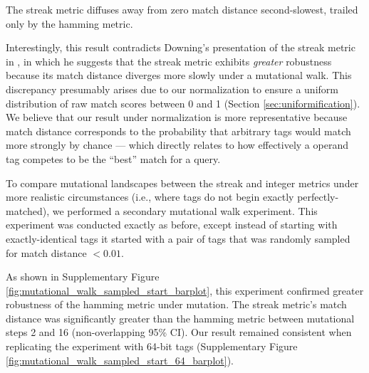 The streak metric diffuses away from zero match distance second-slowest, trailed only by the hamming metric.

Interestingly, this result contradicts Downing's presentation of the streak metric in \citep{downing2015intelligence}, in which he suggests that the streak metric exhibits \textit{greater} robustness because its match distance diverges more slowly under a mutational walk.
This discrepancy presumably arises due to our normalization to ensure a uniform distribution of raw match scores between 0 and 1 (Section \ref{sec:uniformification}).
We believe that our result under normalization is more representative because match distance corresponds to the probability that arbitrary tags would match more strongly by chance --- which directly relates to how effectively a operand tag competes to be the ``best'' match for a query.

To compare mutational landscapes between the streak and integer metrics under more realistic circumstances (i.e., where tags do not begin exactly perfectly-matched), we performed a secondary mutational walk experiment.
This experiment was conducted exactly as before, except instead of starting with exactly-identical tags it started with a pair of tags that was randomly sampled for match distance $<0.01$.

As shown in Supplementary Figure \ref{fig:mutational_walk_sampled_start_barplot}, this experiment confirmed greater robustness of the hamming metric under mutation.
The streak metric's match distance was significantly greater than the hamming metric between mutational steps 2 and 16 (non-overlapping 95\% CI).
Our result remained consistent when replicating the experiment with 64-bit tags (Supplementary Figure \ref{fig:mutational_walk_sampled_start_64_barplot}).
